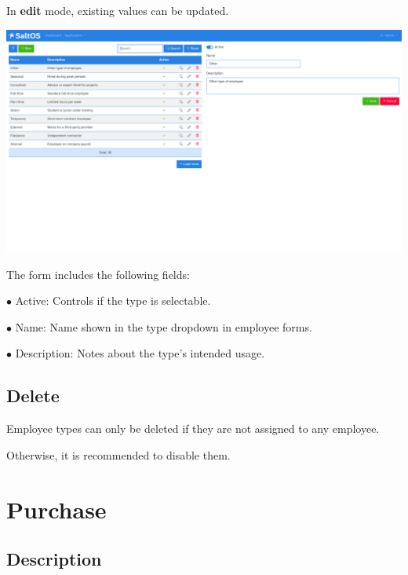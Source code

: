 \documentclass[a4paper]{article}
\begin{document}
In \textbf{edit} mode, existing values can be updated.

\begin{center}\includegraphics[width=1\textwidth]{../ujest/snaps/test-screenshots-js-screenshots-hr-employees-types-edit-10-en-us-1-snap.png}\end{center}

The form includes the following fields:

\begin{compactitem}
\item[\color{myblue}$\bullet$] Active: Controls if the type is selectable.
\item[\color{myblue}$\bullet$] Name: Name shown in the type dropdown in employee forms.
\item[\color{myblue}$\bullet$] Description: Notes about the type’s intended usage.
\end{compactitem}

\hypertarget{toc115}{}
\subsection{Delete}

Employee types can only be deleted if they are not assigned to any employee.

Otherwise, it is recommended to disable them.


\hypertarget{toc116}{}
\section{Purchase}

\hypertarget{toc117}{}
\subsection{Description}
\end{document}
